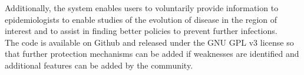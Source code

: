 Additionally, the system enables users to voluntarily provide information to epidemiologists to enable studies of the evolution of disease in the region of interest and to assist in finding better policies to prevent further infections.
\\
The code is available on Github and released under the GNU GPL v3 license so that further protection mechanisms can be added if weaknesses are identified and additional features can be added by the community.


%
%
